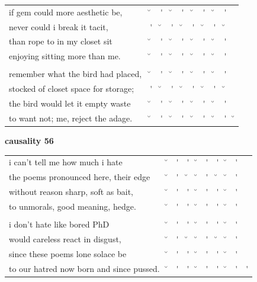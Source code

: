 \documentclass[12pt, landscape]{article}
\begin{document}
\begin{center}
\begin{tabularx}{\textwidth}{
>{\lefting\arraybackslash}X
c
c
c
c
c
c
c
c
c
}

if gem could more aesthetic be, & \u{} & \'{} & \u{} & \'{} & \u{} & \'{} & \u{} & \'{} & \\
never could i break it tacit, & \'{} & \u{} & \'{} & \u{} & \'{} & \u{} & \'{} & \u{} & \\
than rope to in my closet sit & \u{} & \'{} & \u{} & \'{} & \u{} & \'{} & \u{} & \'{} & \\
enjoying sitting more than me. & \u{} & \'{} & \u{} & \'{} & \u{} & \'{} & \u{} & \'{} & \\
 & & & & & & & & \\
remember what the bird had placed,  & \u{} & \'{} & \u{} & \'{} & \u{} & \'{} & \u{} & \'{} & \\
stocked of closet space for storage; & \'{} & \u{} & \'{} & \u{} & \'{} & \u{} & \'{} & \u{} & \\
the bird would let it empty waste & \u{} & \'{} & \u{} & \'{} & \u{} & \'{} & \u{} & \'{} & \\
to want not; me, reject the adage. & \u{} & \'{} & \u{} & \'{} & \u{} & \'{} & \u{} & \'{} & \u{} \\
\end{tabularx}
\end{center}

\vspace*{\fill}

\newpage

\vspace*{\fill}

\noindent \textbf{causality 56}
\noindent \hfill \par

\begin{center}
\begin{tabularx}{\textwidth}{
>{\lefting\arraybackslash}X
c
c
c
c
c
c
c
c
c
}

i can't tell me how much i hate & \u{} & \'{} & \'{} & \u{} & \'{} & \'{} & \u{} & \'{} & \\
the poems pronounced here, their edge & \u{} & \'{} & \u{} & \u{} & \'{} & \u{} & \u{} & \'{} & \\
without reason sharp, soft as bait, & \u{} & \'{} & \'{} & \u{} & \'{} & \'{} & \u{} & \'{} & \\
to unmorals, good meaning, hedge. & \u{} & \'{} & \'{} & \u{} & \'{} & \'{} & \u{} & \'{} & \\
 & & & & & & & & \\
i don't hate like bored PhD  & \u{} & \'{} & \'{} & \u{} & \'{} & \'{} & \u{} & \'{} & \\
would careless react in disgust, & \u{} & \'{} & \u{} & \u{} & \'{} & \u{} & \u{} & \'{} & \\
since these poems lone solace be & \u{} & \'{} & \'{} & \u{} & \'{} & \'{} & \u{} & \'{} & \\
to our hatred now born and since pussed.& \u{} & \'{} & \'{} & \u{} & \'{} & \'{} & \u{} & \'{} & \'{} \\
\end{tabularx}
\end{center}
\end{document}
